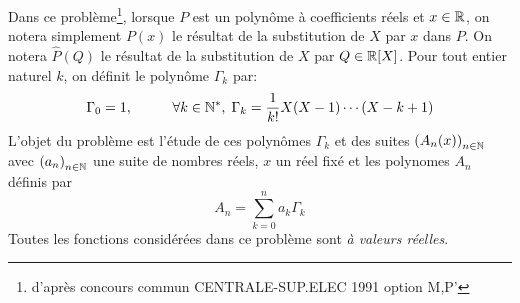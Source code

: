 Dans ce problème\footnote{d'après concours commun CENTRALE-SUP.ELEC 1991 option M,P'}, lorsque $P$ est un polynôme à coefficients réels et $x\in \mathbb{R}$, on notera simplement $P(x)$ le résultat de la substitution de $X$ par $x$ dans $P$. On notera $\widehat{P}(Q)$ le résultat de la substitution de $X$ par $Q\in \mathbb{R}[X]$.\newline  
Pour tout entier naturel $k$, on définit le polynôme $\Gamma_k$ par:
\begin{displaymath}
 \Gamma_0 = 1,\hspace{1cm}\forall k\in \mathbb{N}^*,\;\Gamma_k = \frac{1}{k!}X(X-1)\cdots(X-k+1)
\end{displaymath}
L'objet du problème est l'étude de ces polynômes $\Gamma_k$ et des suites $\left( A_n(x)\right) _{n\in \mathbb{N}}$ avec $\left( a_n\right) _{n\in \mathbb{N}}$ une suite de nombres réels, $x$ un réel fixé et les polynomes $A_n$ définis par 
\begin{displaymath}
  A_n = \sum_{k=0}^{n}a_k\Gamma_k
\end{displaymath}
Toutes les fonctions considérées dans ce problème sont \emph{à valeurs réelles}.

